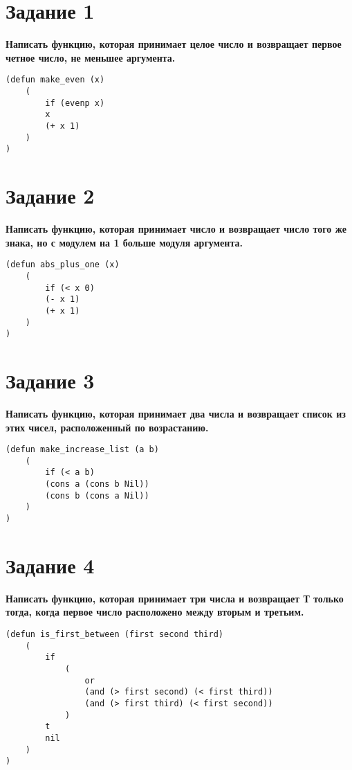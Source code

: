 \documentclass[a4paper,14pt, unknownkeysallowed]{extreport}
\begin{document}


\section*{Задание 1}

\textbf{Написать функцию, которая принимает целое число и возвращает первое четное число, не меньшее аргумента.}

\begin{lstlisting}
(defun make_even (x)
	( 	
		if (evenp x)
		x
		(+ x 1)
	)
)
\end{lstlisting}

\section*{Задание 2}

\textbf{Написать функцию, которая принимает число и возвращает число того же знака, но с модулем на 1 больше модуля аргумента.}

\begin{lstlisting}
(defun abs_plus_one (x)
	(	
		if (< x 0)
		(- x 1)
		(+ x 1)
	)
)
\end{lstlisting}

\clearpage

\section*{Задание 3}

\textbf{Написать функцию, которая принимает два числа и возвращает список из этих чисел, расположенный по возрастанию.}

\begin{lstlisting}
(defun make_increase_list (a b)
	(
		if (< a b)
		(cons a (cons b Nil))
		(cons b (cons a Nil))
	)
)
\end{lstlisting}

\section*{Задание 4}

\textbf{Написать функцию, которая принимает три числа и возвращает Т только тогда, когда первое число расположено между вторым и третьим.}

\begin{lstlisting}
(defun is_first_between (first second third)
	(
		if 
			(
				or 
				(and (> first second) (< first third))
				(and (> first third) (< first second))
			)
		t
		nil
	)
)
\end{lstlisting}
\end{document}
